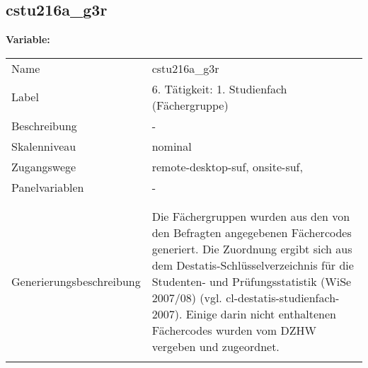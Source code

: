 	
	
	\subsection{cstu216a\_g3r}
	\label{subSection:cstu216a_g3r}

	\noindent\textbf{Variable:}\\
		\begin{tabular}{lL{11.3cm}}
			\label{tableVariable:cstu216a_g3r}
			Name & cstu216a\_g3r \\
			Label & 6. Tätigkeit: 1. Studienfach (Fächergruppe) \\
			Beschreibung & - \\
			Skalenniveau & nominal \\
			Zugangswege &
				remote-desktop-suf,
				onsite-suf,
 \\
			Panelvariablen & -
			 \\
			 \\
 \\
					Generierungsbeschreibung & Die Fächergruppen wurden aus den von den Befragten angegebenen Fächercodes generiert. Die Zuordnung ergibt sich aus dem Destatis-Schlüsselverzeichnis für die Studenten- und Prüfungsstatistik (WiSe 2007/08) (vgl. cl-destatis-studienfach-2007).  Einige darin nicht enthaltenen Fächercodes wurden vom DZHW vergeben und zugeordnet. 
				 \\	
			 \\
		\end{tabular}






